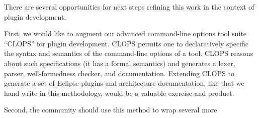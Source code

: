 \documentclass[conference]{IEEEtran}
\begin{document}
There are several opportunities for next steps refining this work in
the context of plugin development.  

First, we would like to augment our advanced command-line options tool
suite ``CLOPS'' for plugin development.  CLOPS permits one to
declaratively specific the syntax and semantics of the command-line
options of a tool.  CLOPS reasons about such specifications (it has a
formal semantics) and generates a lexer, parser, well-formedness
checker, and documentation.  Extending CLOPS to generate a set of
Eclipse plugins and architecture documentation, like that we
hand-write in this methodology, would be a valuable exercise and
product.

Second, the community should use this method to wrap several more 






%
%
%
%





\end{document}

